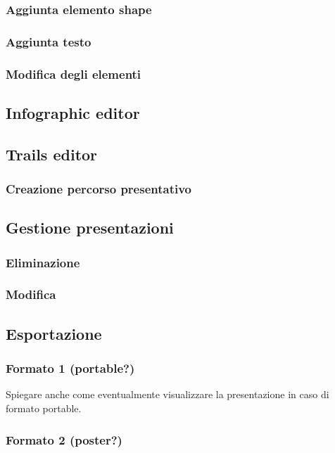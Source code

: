 \subsubsection{Aggiunta elemento shape}
\subsubsection{Aggiunta testo}
\subsubsection{Modifica degli elementi}

\subsection{Infographic editor}

\subsection{Trails editor}

\subsubsection{Creazione percorso presentativo}


\subsection{Gestione presentazioni}
\subsubsection{Eliminazione}
\subsubsection{Modifica}

\subsection{Esportazione}
\subsubsection{Formato 1 (portable?)}
Spiegare anche come eventualmente visualizzare la presentazione in caso di formato portable.
\subsubsection{Formato 2 (poster?)}

